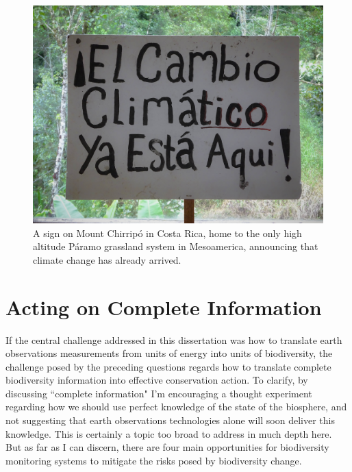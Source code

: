 \begin{figure}[!ht]
    \centering
    \includegraphics[width=\textwidth]{figures/conclusions-climate-change.jpg}
    \caption{A sign on Mount Chirripó in Costa Rica, home to the only high altitude Páramo grassland system in Mesoamerica, announcing that climate change has already arrived.}
    \label{fig:climage-change}
\end{figure}

\section{Acting on Complete Information}

If the central challenge addressed in this dissertation was how to translate earth observations measurements from units of energy into units of biodiversity, the challenge posed by the preceding questions regards how to translate complete biodiversity information into effective conservation action. To clarify, by discussing ``complete information" I'm encouraging a thought experiment regarding how we should use perfect knowledge of the state of the biosphere, and not suggesting that earth observations technologies alone will soon deliver this knowledge. This is certainly a topic too broad to address in much depth here. But as far as I can discern, there are four main opportunities for biodiversity monitoring systems to mitigate the risks posed by biodiversity change.

